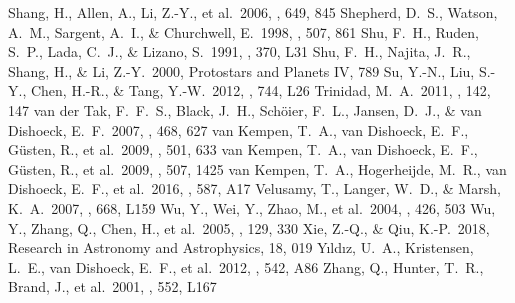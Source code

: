 \documentclass[twocolumn]{aastex62}
\begin{document}
\begin{CJK*}{UTF8}{gbsn}
\begin{thebibliography}{}
 Shang, H., Allen, A., Li, Z.-Y., et al.\ 2006, \apj, 649, 845 
 Shepherd, D.~S., Watson, A.~M., Sargent, A.~I., \& Churchwell, E.\ 1998, \apj, 507, 861 
 Shu, F.~H., Ruden, S.~P., Lada, C.~J., \& Lizano, S.\ 1991, \apjl, 370, L31
 Shu, F.~H., Najita, J.~R., Shang, H., \& Li, Z.-Y.\ 2000, Protostars and Planets IV, 789
 Su, Y.-N., Liu, S.-Y., Chen, H.-R., \& Tang, Y.-W.\ 2012, \apjl, 744, L26 
 Trinidad, M.~A.\ 2011, \aj, 142, 147 
 van der Tak, F.~F.~S., Black, J.~H., Sch{\"o}ier, F.~L., Jansen, D.~J., \& van Dishoeck, E.~F.\ 2007, \aap, 468, 627
 van Kempen, T.~A., van Dishoeck, E.~F., G{\"u}sten, R., et al.\ 2009, \aap, 501, 633 
 van Kempen, T.~A., van Dishoeck, E.~F., G{\"u}sten, R., et al.\ 2009, \aap, 507, 1425 
 van Kempen, T.~A., Hogerheijde, M.~R., van Dishoeck, E.~F., et al.\ 2016, \aap, 587, A17
 Velusamy, T., Langer, W.~D., \& Marsh, K.~A.\ 2007, \apjl, 668, L159 
 Wu, Y., Wei, Y., Zhao, M., et al.\ 2004, \aap, 426, 503
 Wu, Y., Zhang, Q., Chen, H., et al.\ 2005, \aj, 129, 330 
 Xie, Z.-Q., \& Qiu, K.-P.\ 2018, Research in Astronomy and Astrophysics, 18, 019
 Y{\i}ld{\i}z, U.~A., Kristensen, L.~E., van Dishoeck, E.~F., et al.\ 2012, \aap, 542, A86
 Zhang, Q., Hunter, T.~R., Brand, J., et al.\ 2001, \apjl, 552, L167 
\end{thebibliography}

\appendix

\end{CJK*}
\end{document}
